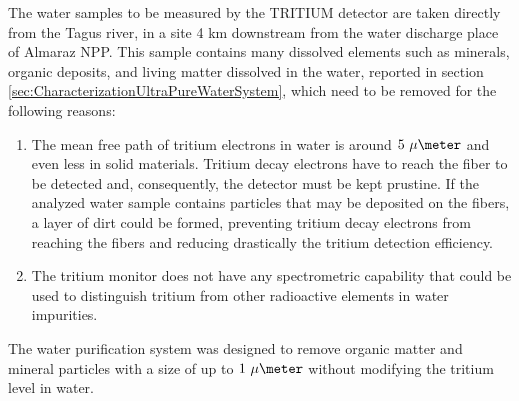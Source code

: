 The water samples to be measured by the TRITIUM detector are taken directly from the Tagus river, in a site 4 km downstream from the water discharge place of Almaraz NPP. This sample contains many dissolved elements such as minerals, organic deposits, and living matter dissolved in the water, reported in section \ref{sec:CharacterizationUltraPureWaterSystem}, which need to be removed for the following reasons:

\begin{enumerate}

\item{} The mean free path of tritium electrons in water is around $5~\mu\meter$ and even less in solid materials. Tritium decay electrons have to reach the fiber to be detected and, consequently, the detector must be kept prustine. If the analyzed water sample contains particles that may be deposited on the fibers, a layer of dirt could be formed, preventing tritium decay electrons from reaching the fibers and reducing drastically the tritium detection efficiency.

\item{} The tritium monitor does not have any spectrometric capability that could be used to distinguish tritium from other radioactive elements in water impurities.

\end{enumerate}

The water purification system was designed to remove organic matter and mineral particles with a size of up to $1~\mu\meter$ without modifying the tritium level in water. 




